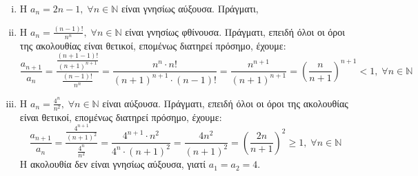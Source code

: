 \documentclass[main.tex]{subfiles}
\begin{document}
\begin{examples}
\item {}
    \begin{enumerate}[i)]
        \item Η $ a_{n} = 2n-1, \; \forall n \in \mathbb{N} $ είναι γνησίως 
            αύξουσα. Πράγματι,


        \item Η $ a_{n} = \frac{(n-1)!}{n^{n}}, \; \forall n \in \mathbb{N} $ 
            είναι γνησίως φθίνουσα. Πράγματι, επειδή όλοι οι όροι της ακολουθίας 
            είναι θετικοί, επομένως διατηρεί πρόσημο, έχουμε:
            \[
                \frac{a_{n+1}}{a_n} =
                \frac{\frac{(n+1-1)!}{(n+1)^{n+1}}}{\frac{(n-1)!}{n^{n}}} =  
                \frac{n^{n}\cdot n!}{(n+1)^{n+1}\cdot (n-1)!} =
                \frac{n^{n+1}}{(n+1)^{n+1}} = \left(\frac{n}{n+1} \right)^{n+1} < 1, \; \forall n
                \in \mathbb{N} 
            \] 

        \item Η $ a_{n}= \frac{4^{n}}{n^{2}}, \; \forall n \in \mathbb{N} $ είναι 
            αύξουσα. Πράγματι, επειδή όλοι οι όροι της ακολουθίας είναι θετικοί, 
            επομένως διατηρεί πρόσημο, έχουμε:
            \[
                \frac{a_{n+1}}{a_{n}} 
                = \frac{\frac{4^{n+1}}{(n+1)^{2}}}{\frac{4^{n}}{n^{2}}} 
                = \frac{4^{n+1}\cdot n^{2}}{4^{n}\cdot (n+1)^{2}} 
                = \frac{4n^{2}}{(n+1)^{2}}
                    = \left( \frac{2n}{n+1} \right)^{2} \geq 1, 
                    \; \forall n \in \mathbb{N} 
                \]
                Η ακολουθία δεν είναι γνησίως αύξουσα, γιατί $ 
                a_{1}= a_{2}=4$.
                

\end{enumerate}
\end{examples}
\end{document}
